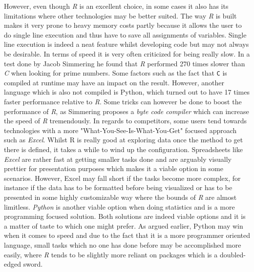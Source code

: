 \documentclass[Report.tex]{subfiles}
\begin{document}
 However, even though \emph{R} is an excellent choice, in some cases it also has its limitations where other technologies may be better suited. The way \emph{R} is built makes it very prone to heavy memory costs partly because it allows the user to do single line execution and thus have to save all assignments of variables. Single line execution is indeed a neat feature whilst developing code but may not always be desirable.  In terms of speed it is very often criticized for being really slow. In a test done by Jacob Simmering \cite{R} he found that \emph{R} performed 270 times slower than \emph{C} when looking for prime numbers. Some factors such as the fact that \texttt{C} is compiled at runtime may have an impact on the result. However, another language which is also not compiled is Python, which turned out to have 17 times faster performance relative to \emph{R}. Some tricks can however be done to boost the performance of \emph{R}, as Simmering proposes a \emph{byte code compiler} which can increase the speed of \emph{R} tremendously. In regards to competitors, some users tend towards technologies with a more "What-You-See-Is-What-You-Get" focused approach such as \emph{Excel}. Whilst R is really good at exploring data once the method to get there is defined, it takes a while to wind up the configuration. Spreadsheets like \emph{Excel} are rather fast at getting smaller tasks done and are arguably visually prettier for presentation purposes which makes it a viable option in some scenarios. However, Excel may fall short if the tasks become more complex, for instance if the data has to be formatted before being visualized or has to be presented in some highly customizable way where the bounds of \emph{R} are almost limitless. \emph{Python} is another viable option when doing statistics and is a more programming focused solution. Both solutions are indeed viable options and it is a matter of taste to which one might prefer. As argued earlier, Python may win when it comes to speed and due to the fact that it is a more programmer oriented language, small tasks which no one has done before may be accomplished more easily, where \emph{R} tends to be slightly more reliant on packages which is a doubled-edged sword.
\end{document}
